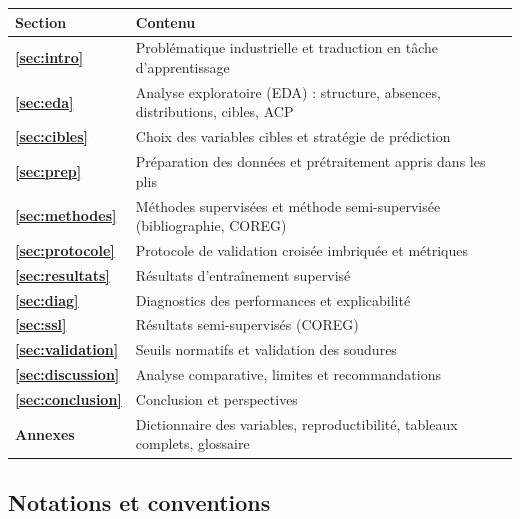 \begin{center}
\small
\begin{tabularx}{\textwidth}{@{}>{\bfseries}l L@{}}
\toprule
Section & Contenu \\
\midrule
\ref{sec:intro}      & Problématique industrielle et traduction en tâche d'apprentissage \\
\ref{sec:eda}        & Analyse exploratoire (EDA) : structure, absences, distributions, cibles, ACP \\
\ref{sec:cibles}     & Choix des variables cibles et stratégie de prédiction \\
\ref{sec:prep}       & Préparation des données et prétraitement appris dans les plis \\
\ref{sec:methodes}   & Méthodes supervisées et méthode semi-supervisée (bibliographie, COREG) \\
\ref{sec:protocole}  & Protocole de validation croisée imbriquée et métriques \\
\ref{sec:resultats}  & Résultats d'entraînement supervisé \\
\ref{sec:diag}       & Diagnostics des performances et explicabilité \\
\ref{sec:ssl}        & Résultats semi-supervisés (COREG) \\
\ref{sec:validation} & Seuils normatifs et validation des soudures \\
\ref{sec:discussion} & Analyse comparative, limites et recommandations \\
\ref{sec:conclusion} & Conclusion et perspectives \\
Annexes              & Dictionnaire des variables, reproductibilité, tableaux complets, glossaire \\
\bottomrule
\end{tabularx}
\end{center}

\subsection*{Notations et conventions}

